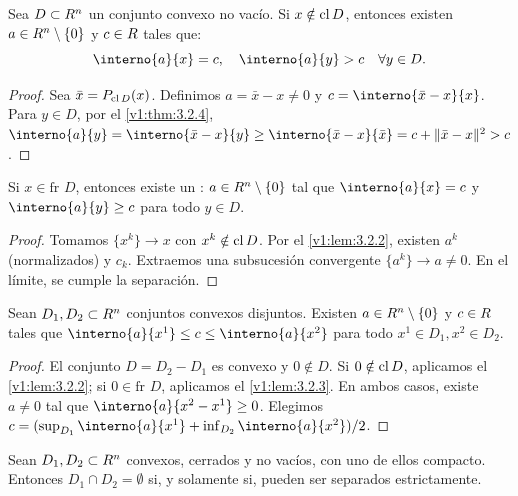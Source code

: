 \begin{lemma}\label{v1:lem:3.2.2}
 Sea $D \subset R^n$ un conjunto convexo no vacío. Si $x \notin \operatorname{cl} D$, entonces existen $a \in R^n \setminus \{0\}$ y $c \in R$ tales que:
 \[
 \interno{a}{x} = c, \quad \interno{a}{y} > c \quad \forall y \in D.
 \]
\end{lemma}

\begin{proof}
 Sea $\bar{x} = P_{\operatorname{cl} D}(x)$. Definimos $a = \bar{x} - x \neq 0$ y $c = \interno{\bar{x} - x}{x}$. Para $y \in D$, por el \cref{v1:thm:3.2.4}, $\interno{a}{y} = \interno{\bar{x} - x}{y} \geq \interno{\bar{x} - x}{\bar{x}} = c + \norm{\bar{x} - x}^2 > c$.
\end{proof}

\begin{lemma}\label{v1:lem:3.2.3}
 Si $x \in \text{fr } D$, entonces existe un : $a \in R^n \setminus \{0\}$ tal que $\interno{a}{x} = c$ y $\interno{a}{y} \geq c$ para todo $y \in D$.
\end{lemma}

\begin{proof}
 Tomamos $\{x^k\} \to x$ con $x^k \notin \operatorname{cl} D$. Por el \cref{v1:lem:3.2.2}, existen $a^k$ (normalizados) y $c_k$. Extraemos una subsucesión convergente $\{a^k\} \to a \neq 0$. En el límite, se cumple la separación.
\end{proof}

\begin{theorem}\label{v1:thm:3.2.5}
 Sean $D_1, D_2 \subset R^n$ conjuntos convexos disjuntos. Existen $a \in R^n \setminus \{0\}$ y $c \in R$ tales que $\interno{a}{x^1} \leq c \leq \interno{a}{x^2}$ para todo $x^1 \in D_1, x^2 \in D_2$.
\end{theorem}

\begin{proof}
 El conjunto $D = D_2 - D_1$ es convexo y $0 \notin D$. Si $0 \notin \operatorname{cl} D$, aplicamos el \cref{v1:lem:3.2.2}; si $0 \in \text{fr } D$, aplicamos el \cref{v1:lem:3.2.3}. En ambos casos, existe $a \neq 0$ tal que $\interno{a}{x^2 - x^1} \ge 0$. Elegimos $c = (\sup_{D_1}\interno{a}{x^1} + \inf_{D_2}\interno{a}{x^2})/2$.
\end{proof}

\begin{theorem}\label{v1:thm:3.2.6}
 Sean $D_1, D_2 \subset R^n$ convexos, cerrados y no vacíos, con uno de ellos compacto. Entonces $D_1 \cap D_2 = \emptyset$ si, y solamente si, pueden ser separados estrictamente.
\end{theorem}

